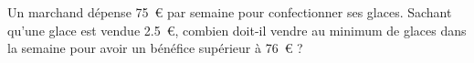 
\begin{exercice}\label{exo2smath-0289}

    Un marchand dépense \SI{75}{€} par semaine pour confectionner ses glaces. Sachant qu'une glace est vendue \SI{2.5}{€}, combien doit-il vendre au minimum de glaces dans la semaine pour avoir un bénéfice supérieur à \SI{76}{€} ?

\end{exercice}
